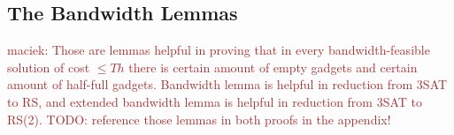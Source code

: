 \documentclass[9pt]{sigcomm-alternate}
\newcommand{\maciek}[1]{\textcolor{brown}{maciek: #1}}
\newcommand{\clauses}{\alpha}
\newcommand{\variables}{\beta}
\newcommand{\Thr}{\ensuremath{Th}}
\begin{document}
\begin{appendix}
%
%
%
%
%
%
\section{The Bandwidth Lemmas}

\maciek{Those are lemmas helpful in proving that in every bandwidth-feasible solution of cost $\leq \Thr$ there is certain amount of empty gadgets and certain amount of half-full gadgets. Bandwidth lemma is helpful in reduction from 3SAT to RS, and extended bandwidth lemma is helpful in reduction from 3SAT to RS(2). TODO: reference those lemmas in both proofs in the appendix!}
  

\end{appendix}
\end{document}
